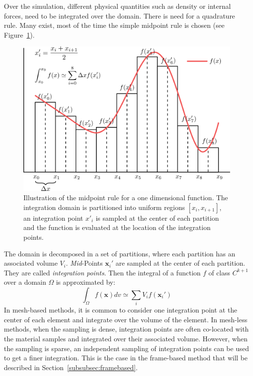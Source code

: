 Over the simulation, different physical quantities such as density or internal forces, need to be integrated over the domain. 
There is need for a quadrature rule. 
Many exist, most of the time the simple midpoint rule is chosen (see Figure~\ref{fig:spatialIntegration}). 
\begin{figure}[H]
	\centering
	\includegraphics[width=0.7\linewidth]{images/continuum_mechanics/spatialIntegration.png}
	\caption[STAR mechanics: Spatial integration]{\label{fig:spatialIntegration} Illustration of the midpoint rule for a one dimensional function. The integration domain is partitioned into uniform regions $\left[x_{i}, x_{i+1}\right]$, an integration point $x'_{i}$ is sampled at the center of each partition and the function is evaluated at the location of the integration points.}
\end{figure}
The domain is decomposed in a set of partitions, where each partition has an associated volume $V_{i}$. 
\emph{Mid}-Points $\mathbf{x}_{i}'$ are sampled at the center of each partition.
They are called \emph{integration points}. 
Then the integral of a function $f$ of class $C^{k+1}$ over a domain $\Omega$ is approximated by:
\begin{equation}
\label{eq:midpointRule}
\int_{\Omega} f(\mathbf{x})dv \simeq \sum_{i} V_{i}f(\mathbf{x}_{i}')
\end{equation}
In mesh-based methods, it is common to consider one integration point at the center of each element and integrate over the volume of the element.
In mesh-less methods, when the sampling is dense, integration points are often co-located with the material samples and integrated over their associated volume. 
However, when the sampling is sparse, an independent sampling of integration points can be used to get a finer integration.
This is the case in the frame-based method that will be described in Section~\ref{subsubsec:framebased}.

